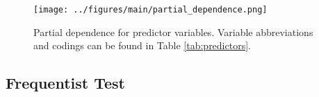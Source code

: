 \begin{figure}[ht!]
  \centering
  \texttt{[image: ../figures/main/partial\_dependence.png]}
  \caption{Partial dependence for predictor variables. Variable abbreviations and codings can be found in Table \ref{tab:predictors}.}
  \label{fig:pd}
\end{figure}



\clearpage

\subsection{Frequentist Test}





\clearpage



